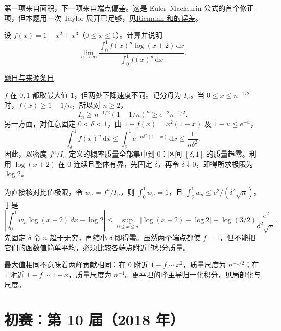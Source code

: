 \documentclass[12pt,fontset=fandol]{ctexart}
\begin{document}
\begin{remark}[方法与条件]第一项来自面积，下一项来自端点偏差。这是 Euler--Maclaurin 公式的首个修正项，但本题用一次 Taylor 展开已足够，见\hyperref[app:integration-riemann]{Riemann 和的误差}。\end{remark}

\begin{example}[来源序号6]\label{ex:pre09-math:6}\label{pr:pre09-math:6}

设 $f(x)=1-x^2+x^3$（$0\le x\le1$）。计算并说明
\[
\lim_{n\to\infty}
\frac{\int_0^1f(x)^n\log(x+2)\,\mathrm dx}{\int_0^1f(x)^n\,\mathrm dx}.
\]

\par\href{https://github.com/lzxcr/cmc-mathematics/blob/64916fa1fdbc3e444a652eca204d5669058ee321/src/problems/preliminary/09/06.md}{题目与来源条目}

\end{example}

\begin{solve}\label{ans:pre09-math:6}

$f$ 在 $0,1$ 都取最大值 $1$，但两处下降速度不同。记分母为 $I_n$。当 $0\le x\le n^{-1/2}$ 时，$f(x)\ge1-1/n$，所以对 $n\ge2$，
\[
I_n\ge n^{-1/2}(1-1/n)^n\ge e^{-2}n^{-1/2}.
\]
另一方面，对任意固定 $0<\delta<1$，由 $1-f(x)=x^2(1-x)$ 及 $1-u\le e^{-u}$，
\[
\int_\delta^1f(x)^n\,\mathrm dx
\le\int_\delta^1e^{-n\delta^2(1-x)}\,\mathrm dx
\le\frac1{n\delta^2}.
\]
因此，以密度 $f^n/I_n$ 定义的概率质量全部集中到 $0$：区间 $[\delta,1]$ 的质量趋零。利用 $\log(x+2)$ 在 $0$ 连续且整体有界，先固定 $\delta$，再令 $\delta\downarrow0$，即得所求极限为 $\boxed{\log2}$。

为直接核对比值极限，令 $w_n=f^n/I_n$，则 $\int_0^1w_n=1$，且 $\int_\delta^1w_n\le e^2/(\delta^2\sqrt n)$。于是
\[
\left|\int_0^1w_n\log(x+2)\,dx-\log2\right|
\le\sup_{0\le x\le\delta}|\log(x+2)-\log2|
+\log(3/2)\frac{e^2}{\delta^2\sqrt n}.
\]
先固定 $\delta$ 令 $n$ 趋于无穷，再缩小 $\delta$ 即得零。虽然两个端点都使 $f=1$，但不能把它们的函数值简单平均，必须比较各端点附近的积分质量。

\end{solve}

\begin{remark}[方法与条件]最大值相同不意味着两峰贡献相同：在 $0$ 附近 $1-f\sim x^2$，质量尺度为 $n^{-1/2}$；在 $1$ 附近 $1-f\sim1-x$，质量尺度为 $n^{-1}$。更平坦的峰主导归一化积分，见\hyperref[app:integration-local]{局部化与尺度}。\end{remark}

\section{初赛：第 10 届（2018 年）}
\end{document}
